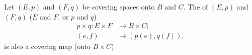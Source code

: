 \documentclass[openany, oneside, a5paper]{book}
\begin{document}
\begin{theorem}
    Let $(E, p)$ and $(F, q)$ be covering spaces onto $B$ and $C$.
    The  of $(E, p)$ and $(F, q)$ ($E$ and $F$, or $p$ and $q$)
    \begin{align*}
        p \times q \colon
         E \times F &\to B \times C;
         \\
         (e, f) &\mapsto (p(e), q(f)),
    \end{align*}
    is also a covering map (onto $B \times C$).
\end{theorem}



\backmatter{}
\nocite{*} %
\printbibliography[heading=bibliography, title={bibliography}]

\printindex[symbol]

\printindex
\end{document}
